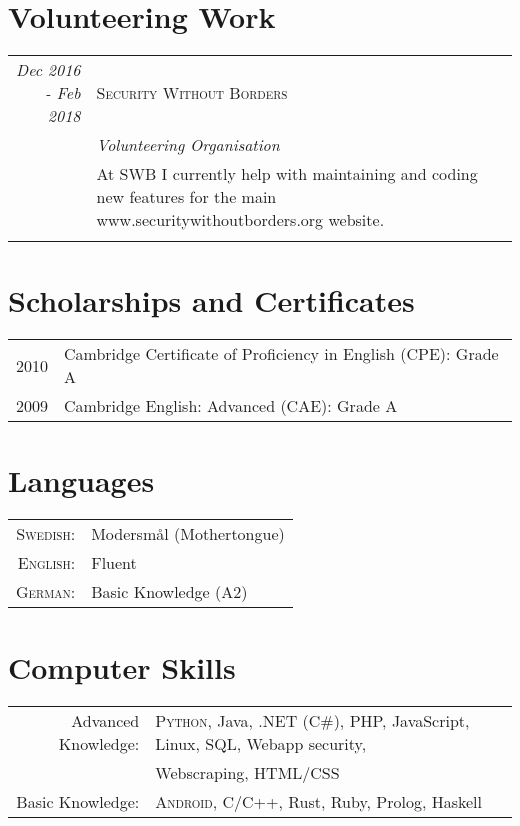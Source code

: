 \documentclass[a4paper,10pt]{article}
\begin{document}
\section{Volunteering Work}
\begin{tabular}{r|p{11cm}}
 \emph{Dec 2016 - Feb 2018} & \textsc{Security Without Borders} \\
 \textsc{}&\emph{Volunteering Organisation}\\
 &\footnotesize{At SWB I currently help with maintaining and coding new features for the main www.securitywithoutborders.org website.} \\ \multicolumn{2}{c}{} \\
 
\end{tabular}

\section{Scholarships and Certificates}
\begin{tabular}{rl}
 \textsc{2010} & Cambridge Certificate of Proficiency in English (CPE): Grade A \\
\textsc{2009} & Cambridge English: Advanced (CAE): Grade A
\end{tabular}

\section{Languages}
\begin{tabular}{rl}
\textsc{Swedish:}& Modersmål (Mothertongue)\\
\textsc{English:}& Fluent\\
\textsc{German:}& Basic Knowledge (A2)\\
\end{tabular}

\section{Computer Skills}
\begin{tabular}{rl}
 Advanced Knowledge:& \textsc{Python}, Java, .NET (C\#), PHP, JavaScript, Linux, SQL, Webapp security,\\& Webscraping, HTML/CSS\\
 Basic Knowledge:&  \textsc{Android}, C/C++, Rust, Ruby, Prolog, Haskell  \\
\end{tabular}
\end{document}

